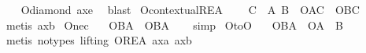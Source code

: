 \begin{isabellebody}
%
\isadelimproof
\ \ %
\endisadelimproof
%
\isatagproof
{}\isamarkupfalse%
\ O{\isacharunderscore}diamond\ ax{\isacharunderscore}{}e\ \isamarkupfalse%
\ blast\isanewline
%
%
\endisatagproof
{\isafoldproof}%
%
\isadelimproof
\isanewline
%
\endisadelimproof
\isanewline
{}\isamarkupfalse%
\ O{\isacharunderscore}contextual{\isacharunderscore}REA{\isacharcolon}\isanewline
\ \ \ {\isachardoublequoteopen}{\isasymTurnstile}\ {\isacharparenleft}{\isacharparenleft}{\isasymbox}{\isacharparenleft}C\ \isactrlbold {\isasymrightarrow}\ {\isacharparenleft}A\ \isactrlbold {\isasymequiv}B{\isacharparenright}{\isacharparenright}{\isacharparenright}\ \isactrlbold {\isasymrightarrow}\ {\isacharparenleft}O{\isacharbraceleft}A{\isacharbar}C{\isacharbraceright}\ \isactrlbold {\isasymequiv}\ O{\isacharbraceleft}B{\isacharbar}C{\isacharbraceright}{\isacharparenright}{\isacharparenright}{\isachardoublequoteclose}\isanewline
%
\isadelimproof
\ \ %
\endisadelimproof
%
\isatagproof
{}\isamarkupfalse%
\ {\isacharparenleft}metis\ ax{\isacharunderscore}{}b{\isacharparenright}\isanewline
%
%
\endisatagproof
{\isafoldproof}%
%
\isadelimproof
\isanewline
%
\endisadelimproof
\isanewline
{}\isamarkupfalse%
\ O{\isacharunderscore}nec{\isacharcolon}\isanewline
\ \ \ {\isachardoublequoteopen}{\isasymTurnstile}{\isacharparenleft}O{\isacharbraceleft}B{\isacharbar}A{\isacharbraceright}\ \isactrlbold {\isasymrightarrow}\ {\isacharparenleft}{\isasymbox}O{\isacharbraceleft}B{\isacharbar}A{\isacharbraceright}{\isacharparenright}{\isacharparenright}{\isachardoublequoteclose}\isanewline
%
\isadelimproof
\ \ %
\endisadelimproof
%
\isatagproof
{}\isamarkupfalse%
\ simp\isanewline
%
%
\endisatagproof
{\isafoldproof}%
%
\isadelimproof
\isanewline
%
\endisadelimproof
\isanewline
{}\isamarkupfalse%
\ O{\isacharunderscore}to{\isacharunderscore}O{\isacharcolon}\isanewline
\ \ \ {\isachardoublequoteopen}{\isasymTurnstile}{\isacharparenleft}O{\isacharbraceleft}B{\isacharbar}A{\isacharbraceright}\ \isactrlbold {\isasymrightarrow}\ O{\isacharparenleft}A\ \isactrlbold {\isasymrightarrow}\ B{\isacharparenright}{\isacharparenright}{\isachardoublequoteclose}\isanewline
%
\isadelimproof
\ \ %
\endisadelimproof
%
\isatagproof
{}\isamarkupfalse%
\ {\isacharparenleft}metis\ {\isacharparenleft}no{\isacharunderscore}types{\isacharcomma}\ lifting{\isacharparenright}\ O{\isacharunderscore}REA\ ax{\isacharunderscore}{}a\ ax{\isacharunderscore}{}b{\isacharparenright}\isanewline

\end{isabellebody}
